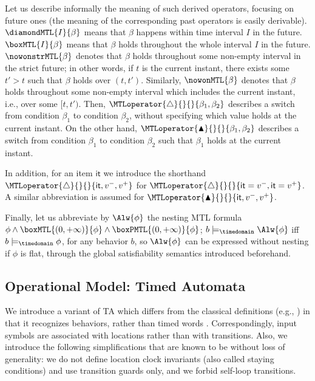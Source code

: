 \documentclass[a4paper]{article}
\newcommand{\modelstime}[1]{\models_{#1}}
\newcommand{\mdt}{\modelstime{\timedomain}}
\newcommand{\iit}{\mathsf{it}}
\newcommand{\becomesMTL}[1]{\MTLoperator{\triangle}{}{}{#1}}
\newcommand{\becomesOMTL}[1]{\MTLoperator{\blacktriangle}{}{}{#1}}
\theoremstyle{plain}
\theoremstyle{definition}
\begin{document}
Let us describe informally the meaning of such derived operators, focusing on future ones (the meaning of the corresponding past operators is easily derivable).
$\diamondMTL{I}{\beta}$ means that $\beta$ happens within time interval $I$ in the future.
$\boxMTL{I}{\beta}$ means that $\beta$ holds throughout the whole interval $I$ in the future.
$\nowonstrMTL{\beta}$ denotes that $\beta$ holds throughout some non-empty interval in the strict future; in other words, if $t$ is the current instant, there exists some $t' > t$ such that $\beta$ holds over $(t, t')$.
Similarly, $\nowonMTL{\beta}$ denotes that $\beta$ holds throughout some non-empty interval which includes the current instant, i.e., over some $[t, t')$.
Then, $\becomesMTL{\beta_1, \beta_2}$ describes a switch from condition $\beta_1$ to condition $\beta_2$, without specifying which value holds at the current instant.
On the other hand, $\becomesOMTL{\beta_1, \beta_2}$ describes a switch from condition $\beta_1$ to condition $\beta_2$ such that $\beta_1$ holds at the current instant.

In addition, for an item $\iit$ we introduce the shorthand $\becomesMTL{\iit, v^-, v^+}$ for $\becomesMTL{\iit = v^-, \iit = v^+}$.
A similar abbreviation is assumed for $\becomesOMTL{\iit, v^-, v^+}$.

Finally, let us abbreviate by $\Alw{\phi}$ the nesting MTL formula $\phi \wedge \boxMTL{(0, +\infty)}{\phi} \wedge \boxPMTL{(0, +\infty)}{\phi}$; $b \mdt \Alw{\phi}$ iff $b \mdt \phi$, for any behavior $b$, so $\Alw{\phi}$ can be expressed without nesting if $\phi$ is flat, through the global satisfiability semantics introduced beforehand.









\subsection{Operational Model: Timed Automata} \label{sec:timedautomata}
We introduce a variant of TA which differs from the classical definitions (e.g., \cite{AD94}) in that it recognizes behaviors, rather than timed words \cite{AFH96,MNP06}.
Correspondingly, input symbols are associated with locations rather than with transitions.
Also, we introduce the following simplifications that are known to be without loss of generality: we do not define location clock invariants (also called staying conditions) and use transition guards only, and we forbid self-loop transitions.
\end{document}
